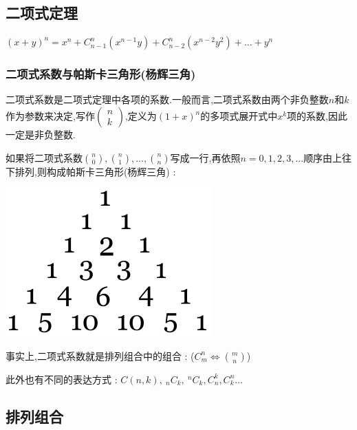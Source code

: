 \documentclass[UTF8,12pt]{ctexbook}
\newcommand{\mathCombination}[2]{C_{#1}^{#2}}
\begin{document}
{{\subsection{二项式定理}{
  $(x + y)^n = x^n + \mathCombination{n - 1}{n}(x^{n-1} y) + \mathCombination{n - 2}{n}(x^{n-2} y^2) + \dots + y^n$

  \subsubsection{二项式系数与帕斯卡三角形(杨辉三角)}{

    二项式系数是二项式定理中各项的系数.一般而言,二项式系数由两个非负整数$n$和$k$作为参数来决定,写作$\begin{pmatrix}
        n \\
        k
      \end{pmatrix}$,定义为$(1 + x)^n$的多项式展开式中$x^k$项的系数,因此一定是非负整数.

    如果将二项式系数$\binom{n}{0},\binom{n}{1},\dots,\binom{n}{n}$写成一行,再依照$n = 0,1,2,3,...$顺序由上往下排列,则构成帕斯卡三角形(杨辉三角) :
    \begin{center}
      \includegraphics[scale=0.5]{resources/Pascal's_triangle_5.svg.png}
    \end{center}

    事实上,二项式系数就是排列组合中的组合 : ($\mathCombination{m}{n} \Longleftrightarrow \binom{m}{n}$)

    此外也有不同的表达方式 : $C(n,k),~_nC_k,~^nC_k,C^k_n,C^n_k\dots$

  }%

}%

\subsection{排列组合}{

}}}
\end{document}
